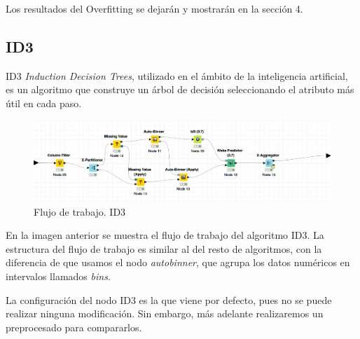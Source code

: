 	Los resultados del Overfitting se dejarán y mostrarán en la sección 4.
	
	\subsection{ID3}
	\hspace{1cm} ID3 \textit{Induction Decision Trees}, utilizado en el ámbito de la inteligencia artificial, es un algoritmo que construye un árbol de decisión seleccionando el atributo más útil en cada paso.
	
	\begin{figure}[H]
		    \centering
			\includegraphics[width=1\textwidth]{img/ID3.png}
			\caption{Flujo de trabajo. ID3}
		\end{figure}
	
	En la imagen anterior se muestra el flujo de trabajo del algoritmo ID3. La estructura del flujo de trabajo es similar al del resto de algoritmos, con la diferencia de que usamos el nodo \textit{autobinner}, que agrupa los datos numéricos en intervalos llamados \textit{bins}.
	
	
	La configuración del nodo ID3 es la que viene por defecto, pues no se puede realizar ninguna modificación. Sin embargo, más adelante realizaremos un preprocesado para compararlos.
	
	\begin{table}[h]
	\end{table}

